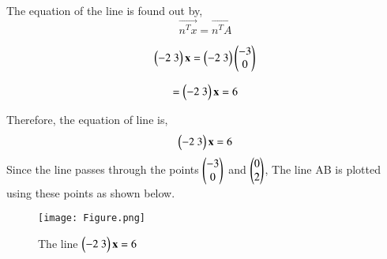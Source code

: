 \documentclass[journal,12pt,twocolumn]{IEEEtran}
\begin{document}
The equation of the line is found out by,\\
\begin{equation}
\vec{n^Tx} = \vec{n^TA}
\end{equation}

\begin{equation}
\myvec{{-2}\ {3}}\vec{x} =  \myvec{{-2}\ {3}}\myvec{-3 \\ 0}
\end{equation}

\begin{equation}
= \begin{pmatrix}{-2}\ {3}\end{pmatrix}\mathbf{x} = 6
\end{equation}

 Therefore, the equation of line is,\\
\begin{equation}
   \begin{pmatrix}{-2}\ {3}\end{pmatrix}\mathbf{x} = 6
\end{equation}
\cleardoublepage
Since the line passes through the points $\begin{pmatrix}-3\\0\end{pmatrix}$ and $\begin{pmatrix}0\\2\end{pmatrix}$, The line AB is plotted using these points as shown below.


\begin{figure}[!h]
         \centering
         \texttt{[image: Figure.png]}
         \caption{The line $\begin{pmatrix}{-2}\ {3}\end{pmatrix}\mathbf{x} = 6$ }
         \label{Figure}
\end{figure}
\end{document}
